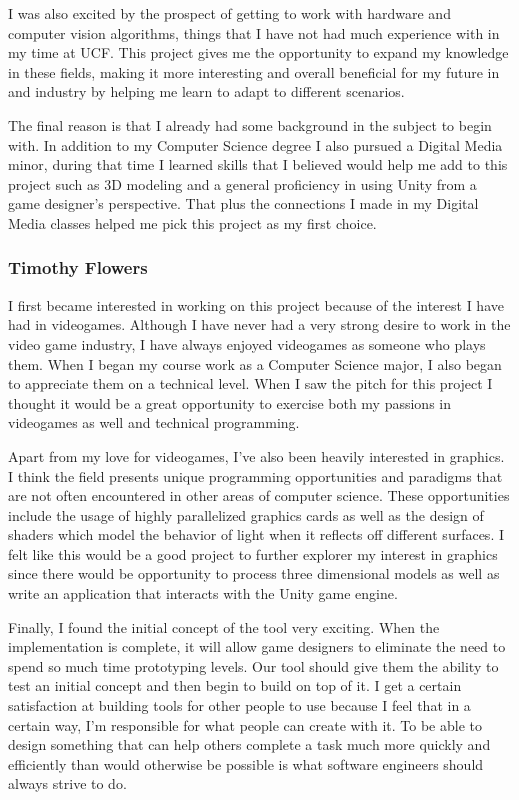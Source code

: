 \documentclass[12pt]{article}
\begin{document}
I was also excited by the prospect of getting to work with hardware and
computer vision algorithms, things that I have not had much experience
with in my time at UCF. This project gives me the opportunity to expand
my knowledge in these fields, making it more interesting and overall
beneficial for my future in and industry by helping me learn to adapt to
different scenarios.

The final reason is that I already had some background in the subject to
begin with. In addition to my Computer Science degree I also pursued a
Digital Media minor, during that time I learned skills that I believed
would help me add to this project such as 3D modeling and a general
proficiency in using Unity from a game designer's perspective. That plus
the connections I made in my Digital Media classes helped me pick this
project as my first choice.

\subsubsection{Timothy Flowers}\label{timothy-flowers}

I first became interested in working on this project because of the
interest I have had in videogames. Although I have never had a very
strong desire to work in the video game industry, I have always enjoyed
videogames as someone who plays them. When I began my course work as a
Computer Science major, I also began to appreciate them on a technical
level. When I saw the pitch for this project I thought it would be a
great opportunity to exercise both my passions in videogames as well and
technical programming.

Apart from my love for videogames, I've also been heavily interested in
graphics. I think the field presents unique programming opportunities
and paradigms that are not often encountered in other areas of computer
science. These opportunities include the usage of highly parallelized
graphics cards as well as the design of shaders which model the behavior
of light when it reflects off different surfaces. I felt like this would
be a good project to further explorer my interest in graphics since
there would be opportunity to process three dimensional models as well
as write an application that interacts with the Unity game engine.

Finally, I found the initial concept of the tool very exciting. When the
implementation is complete, it will allow game designers to eliminate
the need to spend so much time prototyping levels. Our tool should give
them the ability to test an initial concept and then begin to build on
top of it. I get a certain satisfaction at building tools for other
people to use because I feel that in a certain way, I'm responsible for
what people can create with it. To be able to design something that can
help others complete a task much more quickly and efficiently than would
otherwise be possible is what software engineers should always strive to
do.
\end{document}
